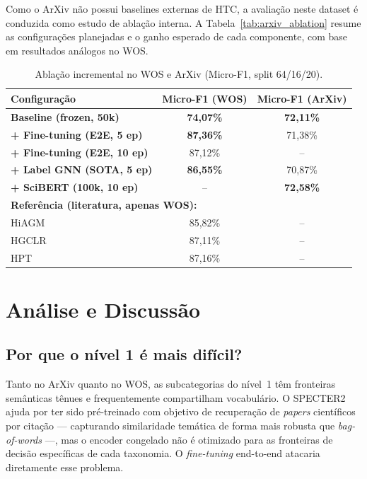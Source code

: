 \documentclass[11pt,a4paper,twoside]{article}
\newcommand{\ours}[1]{\textcolor{ourblue}{\textbf{#1}}}
\begin{document}
Como o ArXiv não possui baselines externas de HTC, a avaliação neste dataset é
conduzida como estudo de ablação interna. A Tabela~\ref{tab:arxiv_ablation}
resume as configurações planejadas e o ganho esperado de cada componente, com
base em resultados análogos no WOS.

\begin{table}[htbp]
\centering
\caption{Ablação incremental no WOS e ArXiv (Micro-F1, split 64/16/20).}
\label{tab:ablation}
\begin{tabular}{lcc}
\toprule
\textbf{Configuração} & \textbf{Micro-F1 (WOS)} & \textbf{Micro-F1 (ArXiv)} \\
\midrule
\ours{Baseline (frozen, 50k)}      & \ours{74,07\%} & \ours{72,11\%} \\
\ours{+ Fine-tuning (E2E, 5 ep)}   & \ours{87,36\%} & 71,38\% \\
\ours{+ Fine-tuning (E2E, 10 ep)}  & 87,12\% & -- \\
\ours{+ Label GNN (SOTA, 5 ep)}    & \ours{86,55\%} & 70,87\% \\
\ours{+ SciBERT (100k, 10 ep)}     & --         & \ours{72,58\%} \\
\bottomrule
\midrule
\multicolumn{3}{l}{\small\textbf{Referência (literatura, apenas WOS):}} \\
HiAGM   & 85,82\% & -- \\
HGCLR   & 87,11\% & -- \\
HPT     & 87,16\% & -- \\
\bottomrule
\end{tabular}
\end{table}

\section{Análise e Discussão}
\label{sec:discussion}

\subsection{Por que o nível 1 é mais difícil?}

Tanto no ArXiv quanto no WOS, as subcategorias do nível~1 têm fronteiras
semânticas tênues e frequentemente compartilham vocabulário. O
\textsc{SPECTER2} ajuda por ter sido pré-treinado com objetivo de recuperação
de \textit{papers} científicos por citação --- capturando similaridade temática
de forma mais robusta que \textit{bag-of-words} ---, mas o encoder congelado não
é otimizado para as fronteiras de decisão específicas de cada taxonomia. O
\textit{fine-tuning} end-to-end atacaria diretamente esse problema.
\end{document}
